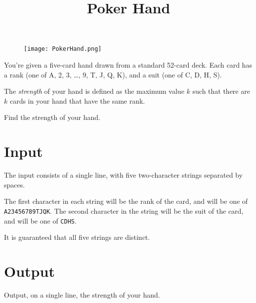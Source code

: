 \documentclass{article}
\title{Poker Hand}
\date{}
\begin{document}
\maketitle
\begin{figure}[h!]
\centering
\texttt{[image: PokerHand.png]}
\end{figure}


You're given a five-card hand drawn from a standard 52-card deck.
Each card has a rank (one of A, 2, 3, \ldots, 9, T, J, Q, K), and
a suit (one of C, D, H, S).


The \emph{strength} of your hand is defined as the maximum value
$k$ such that there are $k$ cards in your hand that have the same rank.

Find the strength of your hand.

\section{Input}

The input consists of a single line, with five two-character
strings separated by spaces.

The first character in each string will be the rank of the card,
and will be one of {\tt A23456789TJQK}. The second character in
the string will be the suit of the card, and will be one of {\tt CDHS}.

It is guaranteed that all five strings are distinct.

\section{Output}

Output, on a single line, the strength of your hand.

\end{document}
